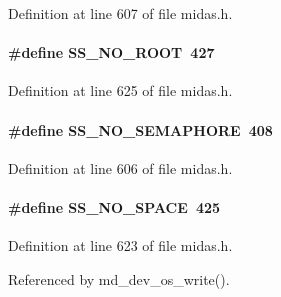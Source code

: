 \begin{DoxyItemize}
\item 
\end{DoxyItemize}

Definition at line 607 of file midas.h.
\paragraph[{SS\_\-NO\_\-ROOT}]{\setlength{\rightskip}{0pt plus 5cm}\#define SS\_\-NO\_\-ROOT~427}\hfill\label{group__err24_gabda878278e2d9236d3b18c1711c4df86}

\begin{DoxyItemize}
\item 
\end{DoxyItemize}

Definition at line 625 of file midas.h.
\paragraph[{SS\_\-NO\_\-SEMAPHORE}]{\setlength{\rightskip}{0pt plus 5cm}\#define SS\_\-NO\_\-SEMAPHORE~408}\hfill\label{group__err24_ga693cdd4ddba4919824025c1c7339e54d}

\begin{DoxyItemize}
\item 
\end{DoxyItemize}

Definition at line 606 of file midas.h.
\paragraph[{SS\_\-NO\_\-SPACE}]{\setlength{\rightskip}{0pt plus 5cm}\#define SS\_\-NO\_\-SPACE~425}\hfill\label{group__err24_gafe95d7246d004e42c34c3ede15d44648}

\begin{DoxyItemize}
\item 
\end{DoxyItemize}

Definition at line 623 of file midas.h.

Referenced by md\_\-dev\_\-os\_\-write().
